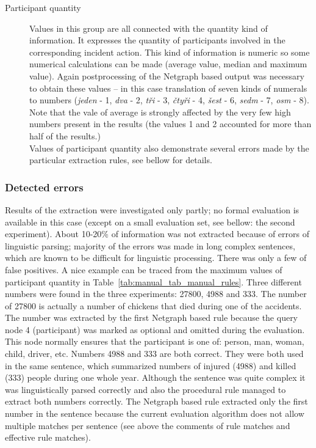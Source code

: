 \begin{description}
	\item[Participant quantity]
Values in this group are all connected with the quantity kind of information. It expresses the quantity of participants involved in the corresponding incident action. This kind of information is numeric so some numerical calculations can be made (average value, median and maximum value). Again postprocessing of the Netgraph based output was necessary to obtain these values -- in this case translation of seven kinds of numerals to numbers (\emph{jeden} - 1, \emph{dva} - 2, \emph{tři} - 3, \emph{čtyři} - 4, \emph{šest} - 6, \emph{sedm} - 7, \emph{osm} - 8). Note that the vale of average is strongly affected by the very few high numbers present in the results (the values 1 and 2 accounted for more than half of the results.)\\
Values of participant quantity also demonstrate several errors made by the particular extraction rules, see bellow for details.
\end{description}





















\subsubsection{Detected errors}

Results of the extraction were investigated only partly; no formal evaluation is available in this case (except on a small evaluation set, see bellow: the second experiment). About 10-20\% of information was not extracted because of errors of linguistic parsing; majority of the errors was made in long complex sentences, which are known to be difficult for linguistic processing. There was only a few of false positives. A nice example can be traced from the maximum values of participant quantity in Table~\ref{tab:manual_tab_manual_rules}. Three different numbers were found in the three experiments: 27800, 4988 and 333. The number of 27800 is actually a number of chickens that died during one of the accidents. The number was extracted by the first Netgraph based rule because the query node 4 (participant) was marked as optional and omitted during the evaluation. This node normally ensures that the participant is one of: person, man, woman, child, driver, etc.
Numbers 4988 and 333 are both correct. They were both used in the same sentence, which summarized numbers of injured (4988) and killed (333) people during one whole year. Although the sentence was quite complex it was linguistically parsed correctly and also the procedural rule managed to extract both numbers correctly. The Netgraph based rule extracted only the first number in the sentence because the current evaluation algorithm does not allow multiple matches per sentence (see above the comments of rule matches and effective rule matches).


